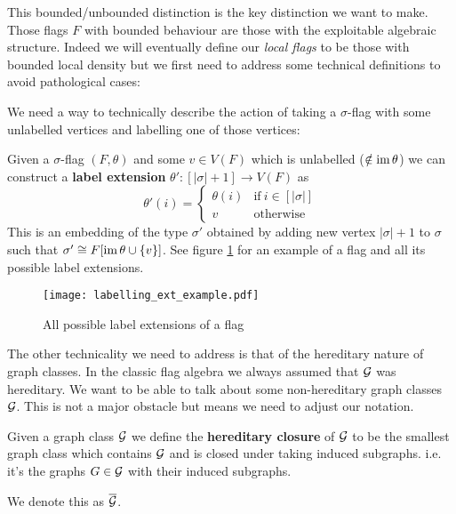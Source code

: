 This bounded/unbounded distinction is the key distinction we want to make. Those
flags $F$ with bounded behaviour are those with the exploitable algebraic structure. Indeed
we will eventually define our \textit{local flags} to be those with bounded local density
but we first need to address some technical definitions to avoid pathological cases:

We need a way to technically describe the action of taking a $\sigma$-flag with some
unlabelled vertices and labelling one of those vertices:

\begin{definition}
    Given a $\sigma$-flag $(F, \theta)$ and some $v\in V(F)$ which is unlabelled
    ($\notin\operatorname{im}\theta$) we can construct a \textbf{label extension}
    $\theta'\colon [|\sigma|+1] \to V(F)$ as
    \[
        \theta'(i) = \begin{cases}
            \theta(i) & \text{if}\ i\in[|\sigma|]\\
            v & \text{otherwise}
        \end{cases}
    \]
    This is an embedding of the type $\sigma'$ obtained by adding new vertex $|\sigma|+1$
    to $\sigma$ such that $\sigma' \cong F[\operatorname{im} \theta \cup \{v\}]$. See figure
    \ref{fig:labelling_ext_example} for an example of a flag and all its possible label
    extensions.
\end{definition}

\begin{figure}[ht]
    \centering
    \texttt{[image: labelling\_ext\_example.pdf]}
    \caption{All possible label extensions of a flag}
    \label{fig:labelling_ext_example}
\end{figure}

The other technicality we need to address is that of the hereditary nature of graph
classes. In the classic flag algebra we always assumed that $\mathcal{G}$ was hereditary. We want
to be able to talk about some non-hereditary graph classes $\mathcal{G}$. This is not a major
obstacle but means we need to adjust our notation.

\begin{definition}
    Given a graph class $\mathcal{G}$ we define the \textbf{hereditary closure} of $\mathcal{G}$ to be
    the smallest graph class which contains $\mathcal{G}$ and is closed under taking
    induced subgraphs. i.e. it's the graphs $G\in\mathcal{G}$ with their induced subgraphs.

    We denote this as $\overline{\mathcal{G}}$.
\end{definition}

